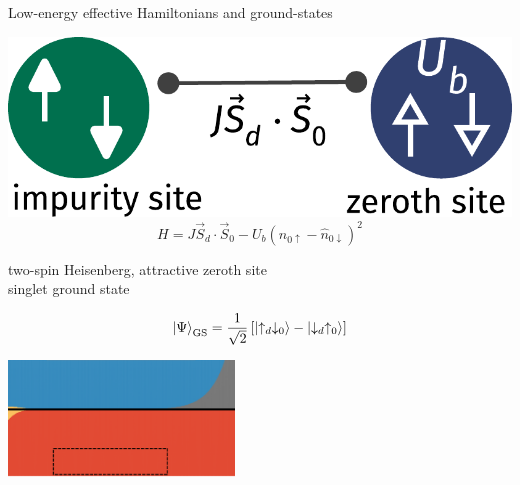 \documentclass[8pt,aspectratio=169]{beamer}
\begin{document}
\begin{frame}{Low-energy effective Hamiltonians and ground-states}
{{\begin{minipage}{0.4\textwidth}
\includegraphics[width=\textwidth]{singlet.pdf}
\[H = J \vec{S}_d\cdot\vec{S}_0 - U_b\left( \hat n_{0 \uparrow} - \hat n_{0 \downarrow} \right)^2\]
\end{minipage}
\hspace*{\fill}
\begin{minipage}{0.45\textwidth}
\vspace*{\fill}
\begin{enumerate}
\nitem two-spin Heisenberg, attractive zeroth site \\[6pt]
\nitem \alert{singlet} ground state\\[10pt]
\end{enumerate}
\[\ket{\Psi}_\text{GS} = \frac{1}{\sqrt 2}\left[\ket{\uparrow_d \downarrow_0} - \ket{\downarrow_d \uparrow_0}\right] \]
\end{minipage}
}

\vspace*{\fill}

\includegraphics[width=0.45\textwidth]{phase-map-MIT1.pdf}
}

\end{frame}
\end{document}
